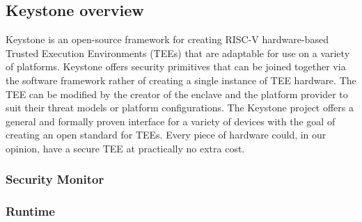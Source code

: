 \subsection{Keystone overview}
Keystone \cite{lee2020keystone} is an open-source framework for creating RISC-V hardware-based Trusted Execution Environments (TEEs) that are adaptable for use on a variety of platforms. Keystone offers security primitives that can be joined together via the software framework rather of creating a single instance of TEE hardware. The TEE can be modified by the creator of the enclave and the platform provider to suit their threat models or platform configurations. The Keystone project offers a general and formally proven interface for a variety of devices with the goal of creating an open standard for TEEs. Every piece of hardware could, in our opinion, have a secure TEE at practically no extra cost.
\subsubsection{Security Monitor}
\subsubsection{Runtime}
